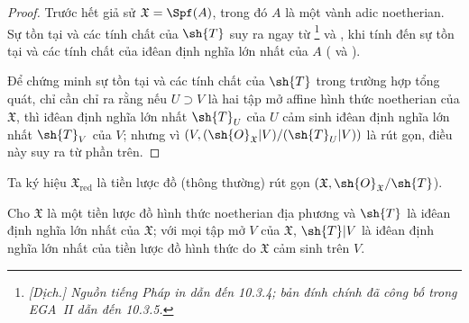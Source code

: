 \documentclass[oneside]{amsart}
\newcommand{\oldpage}[2][]{{\marginnote{\normalfont\textbf{#1}~|~#2}}\ignorespaces}
\let\EGAOriginalLabel\label
\renewcommand{\label}[1]{\phantomsection\EGAOriginalLabel{#1}}
\begin{document}
\begin{proof}
Trước hết giả sử $\mathfrak{X}=\Spf(A)$, trong đó $A$ là một vành adic noetherian.
Sự tồn tại và các tính chất của $\sh{T}$ suy ra ngay từ \footnote{\emph{[Dịch.] Nguồn tiếng Pháp in dẫn đến 10.3.4; bản đính chính đã công bố trong EGA~II dẫn đến 10.3.5.}} và , khi tính đến sự tồn tại và các tính chất của iđêan định nghĩa lớn nhất của $A$ ( và ).

Để chứng minh sự tồn tại và các tính chất của $\sh{T}$ trong trường hợp tổng quát, chỉ cần chỉ ra rằng nếu $U\supset V$ là hai tập mở affine hình thức noetherian của $\mathfrak{X}$, thì iđêan định nghĩa lớn nhất $\sh{T}_U$ của $U$ cảm sinh iđêan định nghĩa lớn nhất $\sh{T}_V$ của $V$; nhưng vì $(V,(\sh{O}_\mathfrak{X}|V)/(\sh{T}_U|V))$ là rút gọn, điều này suy ra từ phần trên.
\end{proof}

Ta ký hiệu $\mathfrak{X}_\text{red}$ là tiền lược đồ (thông thường) rút gọn $(\mathfrak{X},\sh{O}_\mathfrak{X}/\sh{T}$).

\begin{corollary}[10.5.5]
\label{I.10.5.5}
Cho $\mathfrak{X}$ là một tiền lược đồ hình thức noetherian địa phương và $\sh{T}$ là iđêan định nghĩa lớn nhất của $\mathfrak{X}$; với mọi tập mở $V$ của $\mathfrak{X}$, $\sh{T}|V$ là iđêan định nghĩa lớn nhất của tiền lược đồ hình thức do $\mathfrak{X}$ cảm sinh trên $V$.
\end{corollary}

\oldpage[I]{188}
\end{document}
